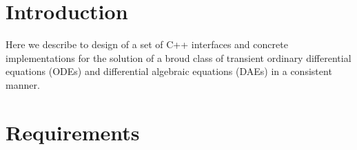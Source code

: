 \documentclass[pdf,ps2pdf,11pt]{SANDreport}
\begin{document}

%
\setcounter{secnumdepth}{3}
\SANDmain %

\section{Introduction}

Here we describe to design of a set of C++ interfaces and concrete
implementations for the solution of a broud class of transient ordinary
differential equations (ODEs) and differential algebraic equations (DAEs) in a
consistent manner.

\section{Requirements}
\end{document}
